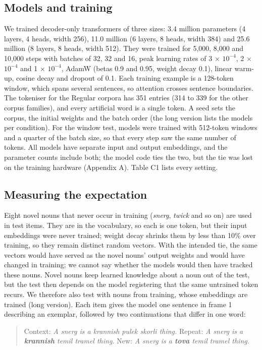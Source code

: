 \subsection{Models and training}
We trained decoder-only transformers of three sizes: 3.4 million parameters (4 layers, 4 heads, width 256), 11.0 million (6 layers, 8 heads, width 384) and 25.6 million (8 layers, 8 heads, width 512). They were trained for 5,000, 8,000 and 10,000 steps with batches of 32, 32 and 16, peak learning rates of 3 $\times$ $10^{-4}$, 2 $\times$ $10^{-4}$ and 1 $\times$ $10^{-4}$, AdamW (betas 0.9 and 0.95, weight decay 0.1), linear warm-up, cosine decay and dropout of 0.1. Each training example is a 128-token window, which spans several sentences, so attention crosses sentence boundaries. The tokeniser for the Regular corpora has 351 entries (314 to 339 for the other corpus families), and every artificial word is a single token. A seed sets the corpus, the initial weights and the batch order (the long version lists the models per condition). For the window test, models were trained with 512-token windows and a quarter of the batch size, so that every step saw the same number of tokens. All models have separate input and output embeddings, and the parameter counts include both; the model code ties the two, but the tie was lost on the training hardware (Appendix A). Table C1 lists every setting.

\subsection{Measuring the expectation}
Eight novel nouns that never occur in training (\emph{snerg}, \emph{twick} and so on) are used in test items. They are in the vocabulary, so each is one token, but their input embeddings were never trained; weight decay shrinks them by less than 10\% over training, so they remain distinct random vectors. With the intended tie, the same vectors would have served as the novel nouns' output weights and would have changed in training; we cannot say whether the models would then have tracked these nouns. Novel nouns keep learned knowledge about a noun out of the test, but the test then depends on the model registering that the same untrained token recurs. We therefore also test with nouns from training, whose embeddings are trained (long version). Each item gives the model one sentence in frame 1 describing an exemplar, followed by two continuations that differ in one word:

\begin{quote}
Context: \emph{A snerg is a krannish pulek skorli thing.} Repeat: \emph{A snerg is a \textbf{krannish} temil tramel thing.} New: \emph{A snerg is a \textbf{tova} temil tramel thing.}
\end{quote}


